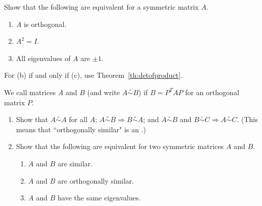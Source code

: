 \documentclass{ximera}
\begin{document}
\begin{problem}\label{prob:ortho15a}
Show that the following are equivalent for a symmetric matrix $A$.


\begin{enumerate}
\item $A$ is orthogonal.
\item $A^{2} = I$.
\item All eigenvalues of $A$ are $\pm 1$.
\end{enumerate}
\begin{hint}
For (b) if and only if (c), use Theorem~\ref{th:detofproduct}.
\end{hint}



\end{problem}


\begin{problem}\label{ex:8_2_12}
We call matrices $A$ and $B$  (and write $A \stackrel{\circ}{\sim} B$) if $B = P^{T}AP$ for an orthogonal matrix $P$.


\begin{enumerate}
\item Show that $A \stackrel{\circ}{\sim} A$ for all $A$; $A \stackrel{\circ}{\sim} B \Rightarrow B \stackrel{\circ}{\sim} A$; and $A \stackrel{\circ}{\sim} B$ and $B \stackrel{\circ}{\sim} C \Rightarrow A \stackrel{\circ}{\sim} C$. (This means that ``orthogonally similar" is an .)

\item Show that the following are equivalent for two symmetric matrices $A$ and $B$.


\begin{enumerate}
\item $A$ and $B$ are similar.

\item $A$ and $B$ are orthogonally similar.

\item $A$ and $B$ have the same eigenvalues.

\end{enumerate}
\end{enumerate}
\end{problem}
\end{document}
